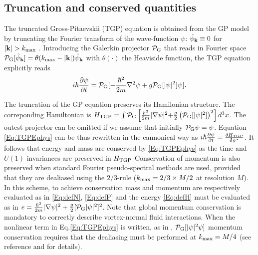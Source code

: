 \documentclass[sn-mathphys]{sn-jnl}%
\def\kmax{k_{\rm max}}
\newcommand\bet{{g}}
\newcommand\alps{{\frac{\hbar^2}{2m}}}
\newcommand\dertt[1]{ \frac{\partial{ #1}}{\partial t} }
\newcommand\gd{\mbox{${\bf \nabla}^{2}$}}
\begin{document}
\subsection{Truncation and conserved quantities}\label{sec:trunc}
The truncated Gross-Pitaevskii (TGP) equation is obtained from the GP model by truncating the Fourier transform of the wave-function $\psi$: $\hat{\psi}_{\bf k}\equiv0$ for $\lvert{\bf k}\rvert>\kmax$ \cite{Davis01,Proukakis08}.
Introducing the Galerkin projector $\mathcal{P}_{\rm G}$ that reads in Fourier space $\mathcal{P}_{\rm G} [ \hat{\psi}_{\bf k}]=\theta(\kmax-\lvert{\bf k}\rvert)\hat{\psi}_{\bf k}$ with $\theta(\cdot)$ the Heaviside function, the TGP equation  explicitly reads
\begin{equation}
i\hbar\dertt{\psi}  =\mathcal{P}_{\rm G} [- \alps \gd \psi + \bet \mathcal{P}_{\rm G} [\lvert\psi\rvert^2]\psi ].
\label{Eq:TGPEphys}
\end{equation}

{The truncation of the GP equation preserves its Hamilonian structure. The correponding Hamiltonian is $H_{\rm TGP}=\int \mathcal{P}_{\rm G}\left[ \alps \lvert \nabla \psi\lvert^2 + \frac\bet2\left(\mathcal{P}_{\rm G} [\lvert\psi\rvert^2] \right)^2\right] d^3x$. The outest projector can be omitted if we assume that initially $\mathcal{P}_{\rm G}\psi=\psi$. Equation \eqref{Eq:TGPEphys} can be thus rewritten in the cannonical way as  $i\hbar\dertt{\psi}=\frac{\delta H_{\rm TGP}}{\delta \psi^*}$. It follows that energy and mass are conserved by \eqref{Eq:TGPEphys} as the time and $U(1)$ invariances are preserved in $H_{\rm TGP}$ Conservation of momentum is also preserved when} standard Fourier pseudo-spectral methods are used, provided that they are dealiased using the $2/3$-rule ($\kmax=2/3\times M/2$ \cite{Got-Ors} at resolution $M$).
In this scheme, to achieve conservation mass and momentum are respectively evaluated as in  \eqref{Eq:defN}, \eqref{Eq:defP} and the energy \eqref{Eq:defH} must be evaluated as in $e=\alps \lvert \nabla \psi \rvert^2 +\frac{g}{2}[\mathcal{P}_{\rm G}\lvert\psi\rvert^2]^2$.
Note that global momentum conservation is mandatory to correctly describe vortex-normal fluid interactions. When the nonlinear term in Eq.\eqref{Eq:TGPEphys} is written, as in  \cite{Davis01}, $\mathcal{P}_{\rm G} [\lvert\psi\rvert^2 \psi]$ momentum conservation requires that the dealiasing must be performed at $\kmax=M/4$ (see reference \cite{Krstulovic11} and \cite{KrstulovicHDR} for details).
\end{document}
